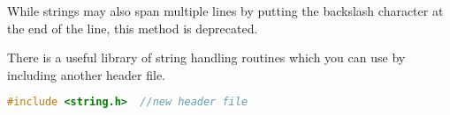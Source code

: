 While strings may also span multiple lines by putting the backslash character
at the end of the line, this method is deprecated. 

There is a useful library of string handling routines which you can use by
including another header file.
\lstset{basicstyle=\scriptsize, numbers=left, captionpos=b, tabsize=4}
\begin{lstlisting}[caption=Section \thesection listing \arabic{arraycnt},language={C},
breaklines=true,xleftmargin=15pt,label=lst:section\thesection listing\arabic{arraycnt}]
#include <string.h>  //new header file
\end{lstlisting}
